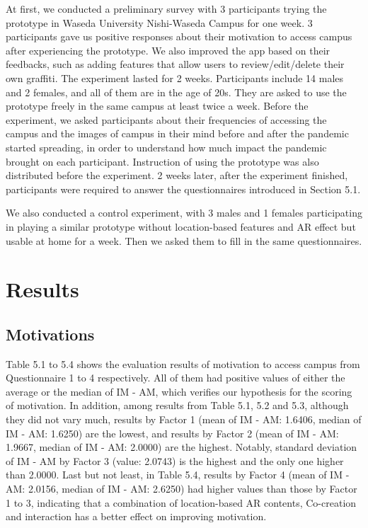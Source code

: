 At first, we conducted a preliminary survey with 3 participants trying the prototype in Waseda University Nishi-Waseda Campus for one week.
3 participants gave us positive responses about their motivation to access campus after experiencing the prototype.
We also improved the app based on their feedbacks, such as adding features that allow users to review/edit/delete their own graffiti.
The experiment lasted for 2 weeks. Participants include 14 males and 2 females, and all of them are in the age of 20s.
They are asked to use the prototype freely in the same campus at least twice a week.
Before the experiment, we asked participants about their frequencies of accessing the campus and the images of campus in their mind before and after the pandemic started spreading,
in order to understand how much impact the pandemic brought on each participant.
Instruction of using the prototype was also distributed before the experiment.
2 weeks later, after the experiment finished, participants were required to answer the questionnaires introduced in Section 5.1.

We also conducted a control experiment, with 3 males and 1 females participating in playing a similar prototype without location-based features and AR effect but usable at home for a week.
Then we asked them to fill in the same questionnaires.

\section{Results}
\subsection{Motivations}

Table 5.1 to 5.4 shows the evaluation results of motivation to access campus from Questionnaire 1 to 4 respectively.
All of them had positive values of either the average or the median of IM - AM, which verifies our hypothesis for the scoring of motivation.
In addition, among results from Table 5.1, 5.2 and 5.3, although they did not vary much, results by Factor 1 (mean of IM - AM: 1.6406, median of IM - AM: 1.6250) are the lowest,
and results by Factor 2 (mean of IM - AM: 1.9667, median of IM - AM: 2.0000) are the highest.
Notably, standard deviation of IM - AM by Factor 3 (value: 2.0743) is the highest and the only one higher than 2.0000.
Last but not least, in Table 5.4, results by Factor 4 (mean of IM - AM: 2.0156, median of IM - AM: 2.6250) had higher values than those by Factor 1 to 3, indicating that a combination of location-based AR contents, Co-creation and interaction has a better effect on improving motivation.

